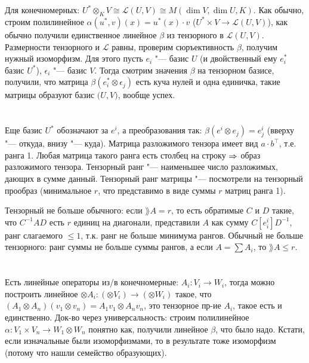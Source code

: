 \section{} %
Для конечномерных: $U^* \otimes_K V \cong \mathcal L(U, V) \cong M(\dim V, \dim U, K)$.
Как обычно, строим полилинейное $\alpha(u^*, v)(x) = u^*(x) \cdot v$ ($U^* \times V \to \mathcal L(U, V)$), как обычно получили единственное
линейное $\beta$ из тензорного в $\mathcal L (U, V)$.
Размерности тензорного и $\mathcal L$ равны, проверим сюръективность $\beta$, получим нужный изоморфизм.
Для этого пусть $e_i$ "--- базис $U$ (и двойственный ему $e_i^*$ базис $U^*$), $\epsilon_i$ "--- базис $V$.
Тогда смотрим значения $\beta$ на тензорном базисе, получили, что матрица $\beta(e_i^*\otimes \epsilon_j)$ есть куча нулей и одна единичка,
такие матрицы образуют базис $\mathcal (U, V)$, вообще успех.

\section{} %
Еще базис $U^*$ обозначают за $e^i$, а преобразования так: $\beta(e^i\otimes e_j)=e^i_j$ (вверху "--- откуда, внизу "--- куда).
Матрица разложимого тензора имеет вид $a\cdot b^\top$, т.е. ранга 1.
Любая матрица такого ранга есть столбец на строку $\Rightarrow$ образ разложимого тензора.
Тензорный ранг "--- наименьшее число разложимых, дающих в сумме данный.
Тензорный ранг матрицы "--- посмотрели на тензорный прообраз (минимальное $r$, что представимо в виде
суммы $r$ матриц ранга 1).

Тензорный не больше обычного: если $\rang A = r$, то есть обратимые $C$ и $D$ такие, что $C^{-1}AD$ есть $r$ единиц на диагонали,
представили $A$ как сумму $C[e^i_i]D^{-1}$, ранг слагаемого $\le 1$, т.к. ранг не больше минимума рангов.
Обычный не больше тензорного: ранг суммы не больше суммы рангов, а если $A=\sum A_i$, то $\rang A \le r$.

\section{} %
Есть линейные операторы из/в конечномерные: $A_i \colon V_i \to W_i$,
тогда можно построить линейное $\otimes A_i \colon (\otimes V_i) \to (\otimes W_i)$ такое,
что $(A_1 \otimes A_n)(v_1\otimes v_n)=A_1v_1 \otimes A_n v_n$, это тензорное пр-ие $A_i$,
такое есть и единственно.
Док-во через универсальность: строим полилинейное $\alpha \colon V_1 \times V_n \to W_1 \otimes W_n$ понятно как,
получили линейное $\beta$, что было надо.
Кстати, если изначальные были изоморфизмами, то в результате тоже изоморфизм (потому что нашли семейство образующих).

